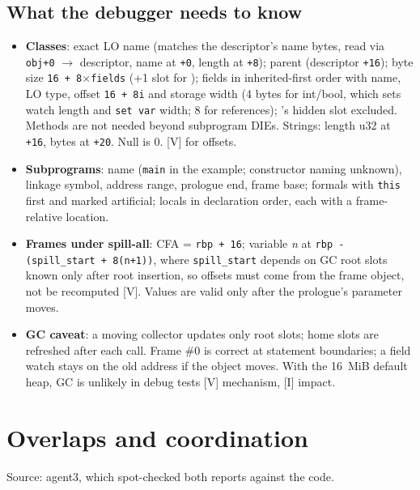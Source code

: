 \documentclass[10pt]{article}
\newcommand{\code}[1]{\texttt{\small #1}}
\newcommand{\mV}{\textsf{\scriptsize[V]}}
\newcommand{\mI}{\textsf{\scriptsize[I]}}
\begin{document}
\subsection{What the debugger needs to know}\label{sec:p4-needs}
\begin{itemize}
\item \textbf{Classes}: exact LO name (matches the descriptor's name bytes, read via \code{obj+0} $\to$ descriptor, name at \code{+0}, length at \code{+8}); parent (descriptor \code{+16}); byte size \code{16 + 8$\times$fields} (+1 slot for ); fields in inherited-first order with name, LO type, offset \code{16 + 8i} and storage width (4 bytes for int/bool, which sets watch length and \code{set var} width; 8 for references); 's hidden slot excluded. Methods are not needed beyond subprogram DIEs. Strings: length u32 at \code{+16}, bytes at \code{+20}. Null is 0. \mV{} for offsets.
\item \textbf{Subprograms}: name (\code{main} in the example; constructor naming unknown), linkage symbol, address range, prologue end, frame base; formals with \code{this} first and marked artificial; locals in declaration order, each with a frame-relative location.
\item \textbf{Frames under spill-all}: CFA = \code{rbp + 16}; variable \emph{n} at \code{rbp - (spill\_start + 8(n+1))}, where \code{spill\_start} depends on GC root slots known only after root insertion, so offsets must come from the frame object, not be recomputed \mV. Values are valid only after the prologue's parameter moves.
\item \textbf{GC caveat}: a moving collector updates only root slots; home slots are refreshed after each call. Frame \#0 is correct at statement boundaries; a field watch stays on the old address if the object moves. With the 16~MiB default heap, GC is unlikely in debug tests \mV{} mechanism, \mI{} impact.
\end{itemize}

\section{Overlaps and coordination}\label{sec:overlap}
Source: agent3, which spot-checked both reports against the code.
\end{document}
